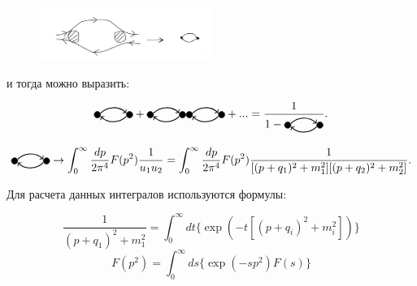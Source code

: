 \documentclass[a4paper,12pt]{article} %
\begin{document}
\begin{figure}[H]
    \centering
    \includegraphics[width=0.5\textwidth]{mases.png}
\end{figure}

и тогда можно выразить:

\begin{equation}
    \tikz[baseline=-0.5ex]{
    \filldraw (0, 0) circle (0.1cm);
    \filldraw (1, 0) circle (0.1cm);
    \draw[->, thick] (0.1, 0.05) to[out=45, in=135] (0.9, 0.05);
    \draw[<-, thick] (0.1, -0.05) to[out=-45, in=-135] (0.9, -0.05);
} + \tikz[baseline=-0.5ex]{
    \filldraw (0, 0) circle (0.1cm);
    \filldraw (1, 0) circle (0.1cm);
    \draw[->, thick] (0.1, 0.05) to[out=45, in=135] (0.9, 0.05);
    \draw[<-, thick] (0.1, -0.05) to[out=-45, in=-135] (0.9, -0.05);
}\tikz[baseline=-0.5ex]{
    \filldraw (0, 0) circle (0.1cm);
    \filldraw (1, 0) circle (0.1cm);
    \draw[->, thick] (0.1, 0.05) to[out=45, in=135] (0.9, 0.05);
    \draw[<-, thick] (0.1, -0.05) to[out=-45, in=-135] (0.9, -0.05);
} + ... = \frac{1}{1 - \tikz[baseline=-0.5ex]{
    \filldraw (0, 0) circle (0.1cm);
    \filldraw (1, 0) circle (0.1cm);
    \draw[->, thick] (0.1, 0.05) to[out=45, in=135] (0.9, 0.05);
    \draw[<-, thick] (0.1, -0.05) to[out=-45, in=-135] (0.9, -0.05);
}}. 
\end{equation}

\begin{equation}
    \tikz[baseline=-0.5ex]{
    \filldraw (0, 0) circle (0.1cm);
    \filldraw (1, 0) circle (0.1cm);
    \draw[->, thick] (0.1, 0.05) to[out=45, in=135] (0.9, 0.05);
    \draw[<-, thick] (0.1, -0.05) to[out=-45, in=-135] (0.9, -0.05);
} \to \int_{0}^{\infty}\frac{dp}{2\pi^4}F(p^2)\frac{1}{u_1u_2} = \int_{0}^{\infty}\frac{dp}{2\pi^4}F(p^2)\frac{1}{[(p + q_1)^2 + m_1^2][(p + q_2)^2 + m_2^2]}.
\end{equation}

Для расчета данных интегралов используются формулы:

\begin{equation}
    \frac{1}{(p + q_1)^2 + m_1^2} = \int_{0}^{\infty}dt\{\exp(-t[(p + q_i)^2 + m_i^2])\} 
\end{equation}
\begin{equation}
    F(p^2) = \int_{0}^{\infty}ds\{\exp(-sp^2)F(s)\} 
\end{equation}
\end{document}
